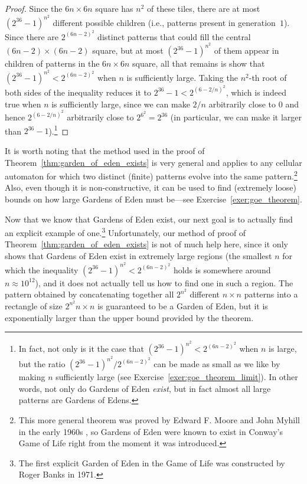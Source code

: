 \begin{proof}
	Since the $6n \times 6n$ square has $n^2$ of these tiles, there are at most $(2^{36}-1)^{n^2}$ different possible children (i.e., patterns present in generation~$1$). Since there are $2^{(6n-2)^2}$ distinct patterns that could fill the central $(6n-2) \times (6n-2)$ square, but at most $(2^{36}-1)^{n^2}$ of them appear in children of patterns in the $6n \times 6n$ square, all that remains is show that $(2^{36}-1)^{n^2} < 2^{(6n-2)^2}$ when $n$ is sufficiently large. Taking the $n^2$-th root of both sides of the inequality reduces it to $2^{36} - 1 < 2^{(6 - 2/n)^2}$, which is indeed true when $n$ is sufficiently large, since we can make $2/n$ arbitrarily close to $0$ and hence $2^{(6 - 2/n)^2}$ arbitrarily close to $2^{6^2} = 2^{36}$ (in particular, we can make it larger than $2^{36} - 1$).\footnote{In fact, not only is it the case that $(2^{36}-1)^{n^2} < 2^{(6n-2)^2}$ when $n$ is large, but the ratio $(2^{36}-1)^{n^2} / 2^{(6n-2)^2}$ can be made as small as we like by making $n$ sufficiently large (see Exercise~\ref{exer:goe_theorem_limit}). In other words, not only do Gardens of Eden \emph{exist}, but in fact almost all large patterns are Gardens of Edens.}
\end{proof}

It is worth noting that the method used in the proof of Theorem~\ref{thm:garden_of_eden_exists} is very general and applies to any cellular automaton for which two distinct (finite) patterns evolve into the same pattern.\footnote{This more general theorem was proved by Edward F. Moore and John Myhill in the early 1960s \cite{Moo62,Myh63}, so Gardens of Eden were known to exist in Conway's Game of Life right from the moment it was introduced.} Also, even though it is non-constructive, it can be used to find (extremely loose) bounds on how large Gardens of Eden must be---see Exercise~\ref{exer:goe_theorem}.

Now that we know that Gardens of Eden exist, our next goal is to actually find an explicit example of one.\footnote{The first explicit Garden of Eden in the Game of Life was constructed by Roger Banks in 1971.} Unfortunately, our method of proof of Theorem~\ref{thm:garden_of_eden_exists} is not of much help here, since it only shows that Gardens of Eden exist in extremely large regions (the smallest $n$ for which the inequality $(2^{36}-1)^{n^2} < 2^{(6n-2)^2}$ holds is somewhere around $n \approx 10^{12}$), and it does not actually tell us how to find one in such a region. The pattern obtained by concatenating together all $2^{n^2}$ different $n \times n$ patterns into a rectangle of size $2^{n^2} n \times n$ is guaranteed to be a Garden of Eden, but it is exponentially larger than the upper bound provided by the theorem.

